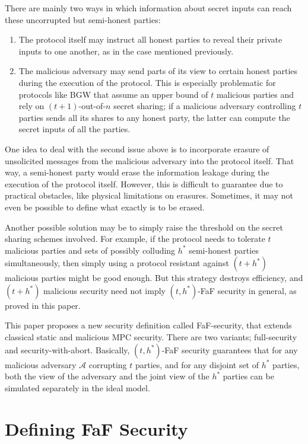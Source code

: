 \documentclass[11pt, a4paper]{article}
\theoremstyle{definition}
\theoremstyle{remark}
\begin{document}
There are mainly two ways in which information about secret inputs can reach these uncorrupted but semi-honest parties:
\begin{enumerate}
    \item The protocol itself may instruct all honest parties to reveal their private inputs to one another, as in the case mentioned previously.
    \item The malicious adversary may send parts of its view to certain honest parties during the execution of the protocol. This is especially problematic for protocols like BGW that assume an upper bound of $t$ malicious parties and rely on $(t+1)$-out-of-$n$ secret sharing; if a malicious adversary controlling $t$ parties sends all its shares to any honest party, the latter can compute the secret inputs of all the parties.
\end{enumerate}

One idea to deal with the second issue above is to incorporate erasure of unsolicited messages from the malicious adversary into the protocol itself. That way, a semi-honest party would erase the information leakage during the execution of the protocol itself. However, this is difficult to guarantee due to practical obstacles, like physical limitations on erasures. Sometimes, it may not even be possible to define what exactly is to be erased.

\medskip

Another possible solution may be to simply raise the threshold on the secret sharing schemes involved. For example, if the protocol needs to tolerate $t$ malicious parties and sets of possibly colluding $h^*$ semi-honest parties simultaneously, then simply using a protocol resistant against $(t+h^*)$ malicious parties might be good enough. But this strategy destroys efficiency, and $(t+h^*)$ malicious security need not imply $(t,h^*)$-FaF security in general, as proved in this paper.

\medskip

This paper proposes a new security definition called FaF-security, that extends classical static and malicious MPC security. There are two variants; full-security and security-with-abort. Basically, $(t,h^*)$-FaF security guarantees that for any malicious adversary $\mathcal{A}$ corrupting $t$ parties, and for any disjoint set of $h^*$ parties, both the view of the adversary and the joint view of the $h^*$ parties can be simulated separately in the ideal model.

\section{Defining FaF Security}
\end{document}
